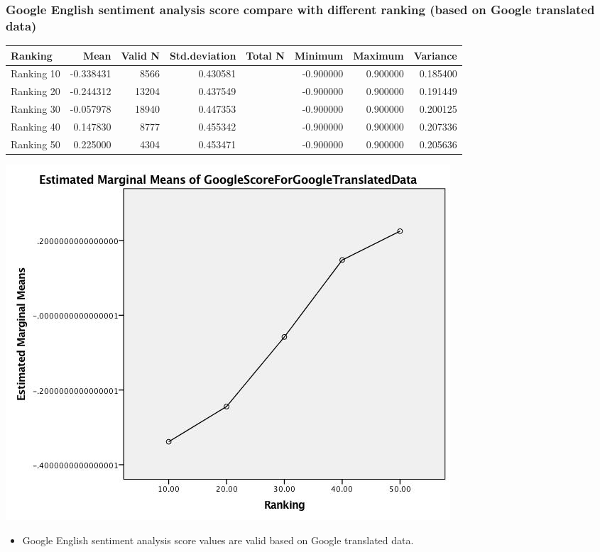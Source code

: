 \subsubsection{Google English sentiment analysis score compare with different ranking (based on Google translated data)}
\label{sec:orga9d4397}
\begin{center}
\begin{tabular}{lrrrlrrr}
Ranking & Mean & Valid N & Std.deviation & Total N & Minimum & Maximum & Variance\\
\hline
Ranking 10 & -0.338431 & 8566 & 0.430581 &  & -0.900000 & 0.900000 & 0.185400\\
Ranking 20 & -0.244312 & 13204 & 0.437549 &  & -0.900000 & 0.900000 & 0.191449\\
Ranking 30 & -0.057978 & 18940 & 0.447353 &  & -0.900000 & 0.900000 & 0.200125\\
Ranking 40 & 0.147830 & 8777 & 0.455342 &  & -0.900000 & 0.900000 & 0.207336\\
Ranking 50 & 0.225000 & 4304 & 0.453471 &  & -0.900000 & 0.900000 & 0.205636\\
\end{tabular}
\end{center}
\begin{center}
\includegraphics[width=.9\linewidth]{./img/MarginalMeansOfGoogleScoreFroGoogleTranslatedData.jpg}
\end{center}

\begin{itemize}
\item Google English sentiment analysis score values are valid based on Google translated data.
\end{itemize}

